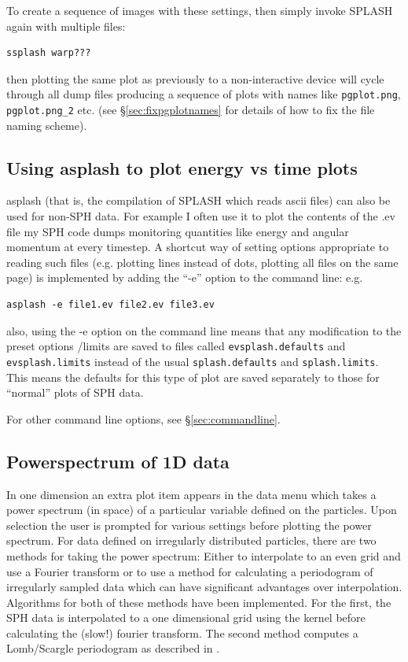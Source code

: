 \documentclass[a4paper,10pt]{article}
\newcommand{\splash}{\textsc{SPLASH }}
\begin{document}
  To create a sequence of images with these settings, then simply invoke \splash again with multiple files:
\begin{verbatim}
ssplash warp???
\end{verbatim}
then plotting the same plot as previously to a non-interactive device will cycle through all dump files producing a sequence of plots with names like \verb+pgplot.png+, \verb+pgplot.png_2+ etc. (see \S\ref{sec:fixpgplotnames} for details of how to fix the file naming scheme).

\subsection{Using asplash to plot energy vs time plots}
\label{sec:evsplash}
 asplash (that is, the compilation of \splash which reads ascii files) can also be used for non-SPH data. For example I often use it to plot the contents of the .ev file my SPH code dumps monitoring quantities like energy and angular momentum at every timestep. A shortcut way of setting options appropriate to reading such files (e.g. plotting lines instead of dots, plotting all files on the same page) is implemented by adding the ``-e'' option to the command line: e.g.
\begin{verbatim}
asplash -e file1.ev file2.ev file3.ev
\end{verbatim}
also, using the -e option on the command line means that any modification to the preset options /limits are saved to files called \verb+evsplash.defaults+ and \verb+evsplash.limits+ instead of the usual \verb+splash.defaults+ and \verb+splash.limits+. This means the defaults for this type of plot are saved separately to those for ``normal'' plots of SPH data.

  For other command line options, see \S\ref{sec:commandline}.

\subsection{Powerspectrum of 1D data}
 In one dimension an extra plot item appears
in the data menu which takes a power spectrum (in space) of a particular
variable defined on the particles. Upon selection the user is prompted for
various settings before plotting the power spectrum. For data defined on
irregularly distributed particles, there are two methods for taking the power
spectrum: Either to interpolate to an even grid and use a Fourier
transform or to use a method for calculating a periodogram of
irregularly sampled data which can have significant advantages over
interpolation. Algorithms for both of these methods have been
implemented. For the first, the SPH data is interpolated to a one dimensional
grid using the kernel before calculating the (slow!) fourier
transform. The second method computes a Lomb/Scargle periodogram as described in \citet{numericalrecipes}. 
\end{document}
